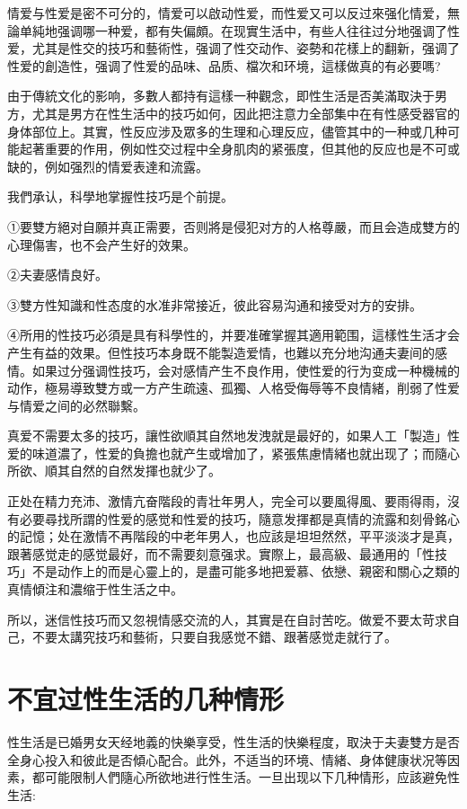 \documentclass[12pt,UTF8]{ctexbook}
\begin{document}
情爱与性爱是密不可分的，情爱可以啟动性爱，而性爱又可以反过來强化情爱，無論单純地强调哪一种爱，都有失偏頗。在现實生活中，有些人往往过分地强调了性爱，尤其是性交的技巧和藝術性，强调了性交动作、姿勢和花樣上的翻新，强调了性爱的創造性，强调了性爱的品味、品质、檔次和环境，這樣做真的有必要嗎?

由于傳統文化的影响，多數人都持有這樣一种觀念，即性生活是否美滿取決于男方，尤其是男方在性生活中的技巧如何，因此把注意力全部集中在有性感受器官的身体部位上。其實，性反应涉及眾多的生理和心理反应，儘管其中的一种或几种可能起著重要的作用，例如性交过程中全身肌肉的紧張度，但其他的反应也是不可或缺的，例如强烈的情爱表達和流露。

我們承认，科學地掌握性技巧是个前提。

①要雙方絕对自願并真正需要，否则將是侵犯对方的人格尊嚴，而且会造成雙方的心理傷害，也不会产生好的效果。

②夫妻感情良好。

③雙方性知識和性态度的水准非常接近，彼此容易沟通和接受对方的安排。

④所用的性技巧必須是具有科學性的，并要准確掌握其適用範围，這樣性生活才会产生有益的效果。但性技巧本身既不能製造爱情，也難以充分地沟通夫妻间的感情。如果过分强调性技巧，会对感情产生不良作用，使性爱的行为变成一种機械的动作，極易導致雙方或一方产生疏遠、孤獨、人格受侮辱等不良情緒，削弱了性爱与情爱之间的必然聯繫。

真爱不需要太多的技巧，讓性欲順其自然地发洩就是最好的，如果人工「製造」性爱的味道濃了，性爱的負擔也就产生或增加了，紧張焦慮情緒也就出现了；而隨心所欲、順其自然的自然发揮也就少了。

正处在精力充沛、激情亢奋階段的青壮年男人，完全可以要風得風、要雨得雨，沒有必要尋找所謂的性爱的感觉和性爱的技巧，隨意发揮都是真情的流露和刻骨銘心的記憶；处在激情不再階段的中老年男人，也应該是坦坦然然，平平淡淡才是真，跟著感觉走的感觉最好，而不需要刻意强求。實際上，最高級、最通用的「性技巧」不是动作上的而是心靈上的，是盡可能多地把爱慕、依戀、親密和關心之類的真情傾注和濃缩于性生活之中。

所以，迷信性技巧而又忽視情感交流的人，其實是在自討苦吃。做爱不要太苛求自己，不要太講究技巧和藝術，只要自我感觉不錯、跟著感觉走就行了。

\section{不宜过性生活的几种情形}

性生活是已婚男女天经地義的快樂享受，性生活的快樂程度，取決于夫妻雙方是否全身心投入和彼此是否傾心配合。此外，不适当的环境、情緒、身体健康状况等因素，都可能限制人們隨心所欲地进行性生活。一旦出现以下几种情形，应該避免性生活:
\end{document}
